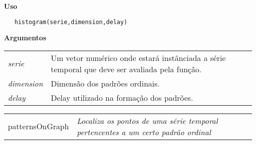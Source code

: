 \documentclass[12pt,letterpaper]{article}
\begin{document}
\vspace{-0.5cm}

\hrulefill  

\vspace{0.5cm}

\textbf{Uso}

\begin{lstlisting}
   histogram(serie,dimension,delay)
\end{lstlisting}

\vspace{0.5cm}

\textbf{Argumentos}

\begin{table}[!h]
\begin{center}
\begin{tabularx}{\textwidth}{X X}
\hspace{0.5cm} \textit{serie} \vspace{0.5cm}& Um vetor numérico onde estará instânciada a série temporal que deve ser avaliada pela função.\vspace{0.5cm}\\
\hspace{0.5cm} \textit{dimension} \vspace{0.5cm}& Dimensão dos padrões ordinais.\vspace{0.5cm}\\
\hspace{0.5cm} \textit{delay} \vspace{0.5cm}& Delay utilizado na formação dos padrões.\vspace{0.5cm}\\
\end{tabularx}
\end{center}
\end{table} 

\newpage

\hrulefill   

\begin{table}[!h]
\begin{center}
\begin{tabularx}{\textwidth}{ X X}
\hspace{0.5cm} patternsOnGraph & \textit{Localiza os pontos de uma série temporal pertencentes a um certo padrão ordinal}
\end{tabularx}
\end{center}
\end{table} 
\end{document}
